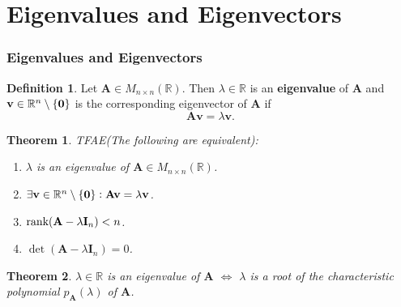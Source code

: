 \documentclass[12pt,openany]{book}
\newtheorem{theorem}{Theorem}[chapter]
\theoremstyle{definition}
\newtheorem{definition}{Definition}[chapter]
\newcommand{\R}{\mathbb{R}}
\newcommand{\by}{\times}
\newcommand{\rank}{\textnormal{rank}}
\renewcommand{\vec}[1]{\textbf{#1}}
\begin{document}
	\newpage
	\section{Eigenvalues and Eigenvectors}
	\subsubsection{Eigenvalues and Eigenvectors}
	\begin{tcolorbox}[colframe=defcolor,title={\color{white}\bf Eigenvalue and Eigenvetor}]
		\begin{definition}
			Let \(\textbf{A}\in M_{n\by n}(\R)\). Then \(\lambda\in\R\) is an \textbf{eigenvalue} of \(\textbf{A}\) and \(\textbf{v}\in\R^n\setminus\set{\textbf{0}}\) is the corresponding eigenvector of \(\textbf{A}\) if \[
			\textbf{Av}=\lambda\textbf{v}.
			\]
		\end{definition}
	\end{tcolorbox}
	\vspace{4pt}
	\begin{tcolorbox}[colframe=thmcolor,title={\color{white}\bf }]
		\begin{theorem}
			TFAE(The following are equivalent):
			\begin{enumerate}[(1)]
				\item \(\lambda\) is an eigenvalue of \(\textbf{A}\in M_{n\by n}(\R)\).
				\item \(\exists\vec{v}\in\R^n\setminus\set{\textnormal{\bf 0}}:\textbf{Av}=\lambda\vec{v}\).
				\item \(\rank(\textbf{A}-\lambda\textbf{I}_n)<n\).
				\item \(\det(\textbf{A}-\lambda\textbf{I}_n)=0\).
			\end{enumerate}
		\end{theorem}
	\end{tcolorbox}
	\vspace{4pt}
	\begin{tcolorbox}[colframe=thmcolor,title={\color{white}\bf }]
		\begin{theorem}
			\(\lambda\in\R\) is an eigenvalue of \(\textbf{A}\) \(\iff\) \(\lambda\) is a root of the characteristic polynomial \(p_\textbf{A}(\lambda)\) of \(\textbf{A}\).
		\end{theorem}
	\end{tcolorbox}
	\vspace{4pt}
\end{document}
